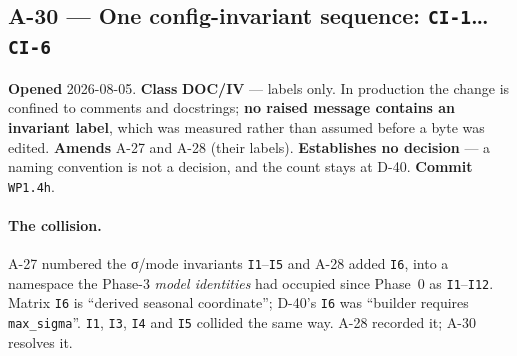 \documentclass[
  10pt,
]{article}
\begin{document}
\hypertarget{a-30}{%
\subsection{A-30 --- One config-invariant sequence: \texttt{CI-1}\ldots\texttt{CI-6}}\label{a-30}}

\textbf{Opened} 2026-08-05. \textbf{Class} \textbf{DOC/IV} --- labels only. In production the change is confined to comments and docstrings; \textbf{no raised message contains an invariant label}, which was measured rather than assumed before a byte was edited. \textbf{Amends} A-27 and A-28 (their labels). \textbf{Establishes no decision} --- a naming convention is not a decision, and the count stays at D-40. \textbf{Commit} \texttt{WP1.4h}.

\paragraph{The collision.}
A-27 numbered the σ/mode invariants \texttt{I1}--\texttt{I5} and A-28 added \texttt{I6}, into a namespace the Phase-3 \emph{model identities} had occupied since Phase~0 as \texttt{I1}--\texttt{I12}. Matrix \texttt{I6} is ``derived seasonal coordinate''; D-40's \texttt{I6} was ``builder requires \texttt{max\_sigma}''. \texttt{I1}, \texttt{I3}, \texttt{I4} and \texttt{I5} collided the same way. A-28 recorded it; A-30 resolves it.
\end{document}
